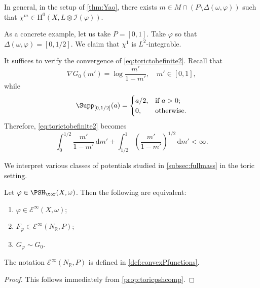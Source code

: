 \begin{example}\label{ex:toric-ample:L966}
    In general, in the setup of \cref{thm:Yao}, there exists $m\in M\cap (P\setminus \Delta(\omega,\varphi))$ such that $\chi^m\in \mathrm{H}^0(X,L\otimes \mathcal{I}(\varphi))$.

    As a concrete example, let us take $P=[0,1]$. Take $\varphi$ so that $\Delta(\omega,\varphi)=[0,1/2]$. We claim that $\chi^1$ is $L^2$-integrable.

    It suffices to verify the convergence of \eqref{eq:torictobefinite2}. Recall that
    \[
    \nabla G_0(m')=\log \frac{m'}{1-m'},\quad m'\in [0,1],
    \]
    while
    \[
    \Supp_{[0,1/2]}(a)=
    \begin{cases}
        a/2,&\textup{if }a>0;\\
        0,&\textup{otherwise}.
    \end{cases}
    \]
    Therefore, \eqref{eq:torictobefinite2} becomes
    \[
    \int_0^{1/2} \frac{m'}{1-m'}\,\mathrm{d}m'+\int_{1/2}^1  \left(\frac{m'}{1-m'}\right)^{1/2}\,\mathrm{d}m'<\infty.
    \]
\end{example}

We interpret various classes of potentials studied in \cref{subsec:fullmass} in the toric setting.
\begin{proposition}\label{prop:toric-ample:L990}
    Let $\varphi\in \PSH_{\tor}(X,\omega)$. Then the following are equivalent:
    \begin{enumerate}
        \item\label{itm:chapter-toric:L976:1} $\varphi\in \mathcal{E}^{\infty}(X,\omega)$;
        \item\label{itm:chapter-toric:L976:2} $F_{\varphi}\in \mathcal{E}^{\infty}(N_{\mathbb{R}},P)$;
        \item\label{itm:chapter-toric:L976:3} $G_{\varphi}\sim G_0$.
    \end{enumerate}
\end{proposition}
The notation $\mathcal{E}^{\infty}(N_{\mathbb{R}},P)$ is defined in \cref{def:convexPfunctions}.
\begin{proof}
    This follows immediately from \cref{prop:toricpshcomp}.
\end{proof}

